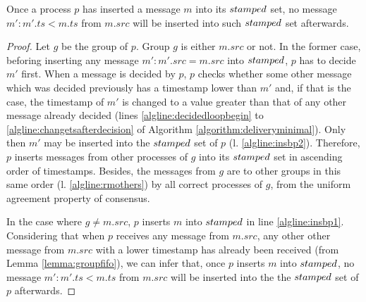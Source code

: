 \documentclass[times, 10pt]{article}
\begin{document}
% 




\begin{lems} \label{lemma:oncedecidednotsmaller}
Once a process $p$ has inserted a message $m$ into its $stamped$ set, no message $m' : m'.ts < m.ts$ from $m.src$ will be inserted into such $stamped$ set afterwards.
\end{lems}

\begin{proof}
Let $g$ be the group of $p$. Group $g$ is either $m.src$ or not. In the former case, beforing inserting any message $m' : m'.src = m.src$ into $stamped$, $p$ has to decide $m'$ first. When a message is decided by $p$, $p$ checks whether some other message which was decided previously has a timestamp lower than $m'$ and, if that is the case, the timestamp of $m'$ is changed to a value greater than that of any other message already decided (lines \ref{algline:decidedloopbegin} to \ref{algline:changetsafterdecision} of Algorithm \ref{algorithm:deliveryminimal}). Only then $m'$ may be inserted into the $stamped$ set of $p$ (l. \ref{algline:insbp2}). Therefore, $p$ inserts messages from other processes of $g$ into its $stamped$ set in ascending order of timestamps. Besides, the messages from $g$ are \rmcast{} to other groups in this same order (l. \ref{algline:rmothers}) by all correct processes of $g$, from the uniform agreement property of consensus.

In the case where $g \neq m.src$, $p$ inserts $m$ into $stamped$ in line \ref{algline:insbp1}. Considering that when $p$ receives any message from $m.src$, any other other message from $m.src$ with a lower timestamp has already been received (from Lemma \ref{lemma:groupfifo}), we can infer that, once $p$ inserts $m$ into $stamped$, no message $m' : m'.ts < m.ts$ from $m.src$ will be inserted into the the $stamped$ set of $p$ afterwards.
\end{proof}
\end{document}
